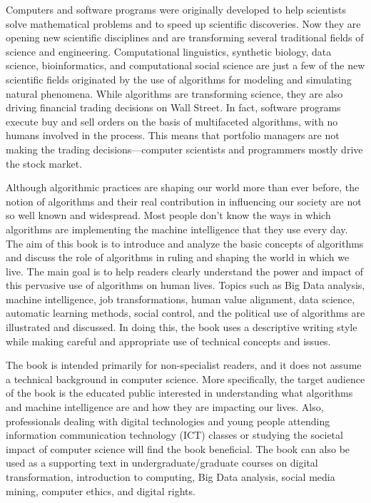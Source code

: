 Computers and software programs were originally developed to help scientists solve mathematical problems and to speed up scientific discoveries. Now they are opening new scientific disciplines and are transforming several traditional fields of science and engineering. Computational linguistics, synthetic biology, data science, bioinformatics, and computational social science are just a few of the new scientific fields originated by the use of algorithms for modeling and simulating natural phenomena. While algorithms are transforming science, they are also driving financial trading decisions on Wall Street. In fact, software programs execute buy and sell orders on the basis of multifaceted algorithms, with no humans involved in the process. This means that portfolio managers are not making the trading decisions---computer scientists and programmers mostly drive the stock market.

Although algorithmic practices are shaping our world more than ever before, the notion of algorithms and their real contribution in influencing our society are not so well known and widespread. Most people don't know the ways in which algorithms are implementing the machine intelligence that they use every day. The aim of this book is to introduce and analyze the basic concepts of algorithms and discuss the role of algorithms in ruling and shaping the world in which we live. The main goal is to help readers clearly understand the power and impact of this pervasive use of algorithms on human lives. Topics such as Big Data analysis, machine intelligence, job transformations, human value alignment, data science, automatic learning methods, social control, and the political use of algorithms are illustrated and discussed. In doing this, the book uses a descriptive writing style while making careful and appropriate use of technical concepts and issues.

The book is intended primarily for non-specialist readers, and it does not assume a technical background in computer science. More specifically, the target audience of the book is the educated public interested in understanding what algorithms and machine intelligence are and how they are impacting our lives. Also, professionals dealing with digital technologies and young people attending information communication technology (ICT) classes or studying the societal impact of computer science will find the book beneficial. The book can also be used as a supporting text in undergraduate/{\allowbreak}graduate courses on digital transformation, introduction to computing, Big Data analysis, social media mining, computer ethics, and digital rights.

